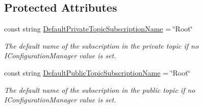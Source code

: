 \subsection*{Protected Attributes}
\begin{DoxyCompactItemize}
\item 
const string \hyperlink{classCqrs_1_1Azure_1_1ServiceBus_1_1AzureServiceBus_adbfdf69ded51320d81fce8e652af9b88_adbfdf69ded51320d81fce8e652af9b88}{Default\+Private\+Topic\+Subscription\+Name} = \char`\"{}Root\char`\"{}
\begin{DoxyCompactList}\small\item\em The default name of the subscription in the private topic if no I\+Configuration\+Manager value is set. \end{DoxyCompactList}\item 
const string \hyperlink{classCqrs_1_1Azure_1_1ServiceBus_1_1AzureServiceBus_a278db23f67223fbb25455038c7fa1ebf_a278db23f67223fbb25455038c7fa1ebf}{Default\+Public\+Topic\+Subscription\+Name} = \char`\"{}Root\char`\"{}
\begin{DoxyCompactList}\small\item\em The default name of the subscription in the public topic if no I\+Configuration\+Manager value is set. \end{DoxyCompactList}\end{DoxyCompactItemize}
